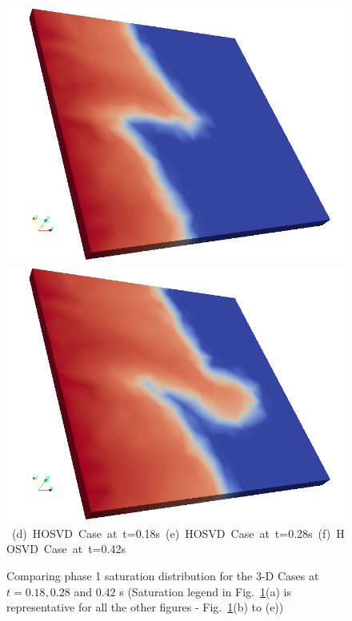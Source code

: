 \begin{landscape}
\begin{figure}[ht]
{{      \includegraphics[width=.5\textwidth]{./Pics/3D_HOSVDCase/3D_HOSVDCase_Saturation_tdot28.png} 
      \includegraphics[width=.5\textwidth]{./Pics/3D_HOSVDCase/3D_HOSVDCase_Saturation_tdot42.png}}
\vspace{0.cm}
\hbox{ \hspace{1.5cm} (d) HOSVD Case at t=0.18s \hspace{1.0cm} (e) HOSVD Case at t=0.28s  \hspace{3.0cm} (f) HOSVD Case at t=0.42s}
\vspace{0.cm}
}   
\caption{Comparing phase 1 saturation distribution for the 3-D Cases at $t=0.18, 0.28$ and $0.42$ s (Saturation legend in Fig.~\ref{fig:Saturationfield4_3DCases}(a) is representative for all the other figures - \ie Fig.~\ref{fig:Saturationfield4_3DCases}(b) to (e))}
\label{fig:Saturationfield4_3DCases}
\end{figure}
\end{landscape}
\clearpage


